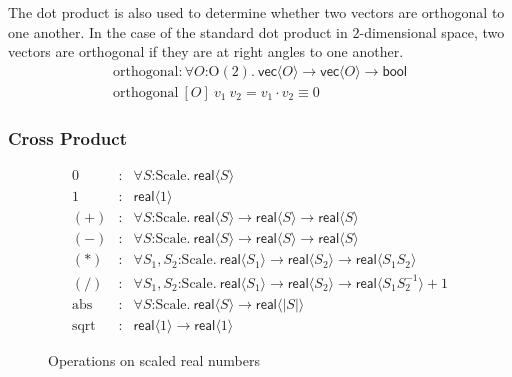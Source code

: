\documentclass{article}
\newcommand{\Orth}{\mathrm{O}}
\newcommand{\Scale}{\mathrm{Scale}}
\begin{document}
The dot product is also used to determine whether two vectors are
orthogonal to one another. In the case of the standard dot product in
$2$-dimensional space, two vectors are orthogonal if they are at right
angles to one another.
\begin{displaymath}
  \begin{array}{l}
    \mathrm{orthogonal} : \forall O \mathord: \Orth(2).\ \mathsf{vec}\langle O \rangle \to \mathsf{vec}\langle O \rangle \to \mathsf{bool} \\
    \mathrm{orthogonal}\ [O]\ v_1\ v_2 = v_1 \cdot v_2 \equiv 0
  \end{array}
\end{displaymath}

\subsubsection{Cross Product}

\begin{figure}[t]
  \centering
  \begin{eqnarray*}
    0   &:& \forall S \mathord:\Scale.\ \mathsf{real}\langle S \rangle \\
    1   &:& \mathsf{real}\langle 1 \rangle \\
    (+) &:& \forall S \mathord:\Scale.\ \mathsf{real}\langle S \rangle \to \mathsf{real}\langle S \rangle \to \mathsf{real}\langle S \rangle \\
    (-) &:& \forall S \mathord:\Scale.\ \mathsf{real}\langle S \rangle \to \mathsf{real}\langle S \rangle \to \mathsf{real}\langle S \rangle \\
    (*) &:& \forall S_1,S_2 \mathord:\Scale.\ \mathsf{real}\langle S_1 \rangle \to \mathsf{real}\langle S_2 \rangle \to \mathsf{real}\langle S_1S_2 \rangle \\
    (/) &:& \forall S_1,S_2 \mathord:\Scale.\ \mathsf{real}\langle S_1 \rangle \to \mathsf{real}\langle S_2 \rangle \to \mathsf{real}\langle S_1S_2^{-1} \rangle + 1 \\
    \mathrm{abs} &:& \forall S \mathord:\Scale.\ \mathsf{real}\langle S \rangle \to \mathsf{real}\langle |S| \rangle \\
    \mathrm{sqrt} &:& \mathsf{real}\langle 1 \rangle \to \mathsf{real}\langle 1 \rangle
  \end{eqnarray*}
  \caption{Operations on scaled real numbers}
  \label{fig:real-ops}
\end{figure}
\end{document}
